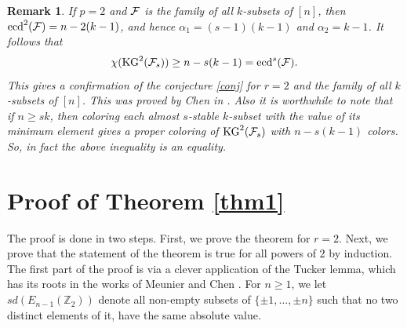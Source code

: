 \documentclass[a4paper,11pt]{article}
\newtheorem{remark}{Remark}[section]
\begin{document}
\begin{remark}
If $p=2$ and $\cal F$ is the family of all $k$-subsets of $[n]$, then $\mbox{ecd}^2({\cal F})=n-2(k-1)$, and hence $\alpha_1=(s-1)(k-1)$ and $\alpha_2=k-1$. It follows that 
$$\chi(\mbox{KG}^2({\cal F}_s))\ge n-s(k-1)=\mbox{ecd}^s({\cal F}).$$
This gives a confirmation of the conjecture \ref{conj} for $r=2$ and the family of all $k$-subsets of $[n]$. This was proved by Chen in \cite{C2}. Also it is worthwhile to note that if $n\ge sk$, then coloring each almost $s$-stable $k$-subset with the value of its minimum element gives a proper coloring of $\mbox{KG}^2({\cal F}_s)$ with $n-s(k-1)$ colors. So, in fact the above inequality is an equality. 
\end{remark}

\section{Proof of Theorem \ref{thm1}}

The proof is done in two steps. First, we prove the theorem for $r=2$. Next, we prove that the statement of the theorem is true for all powers of $2$ by induction.
The first part of the proof is via a clever application of the Tucker lemma, which has its roots in the works of Meunier \cite{M} and Chen \cite{C1}. For $n\ge 1$, we let $sd(E_{n-1}(\mathbb Z_2))$ denote all non-empty subsets of $\{\pm 1,\dots, \pm n\}$ such that no two distinct elements of it, have the same absolute value.
\end{document}
